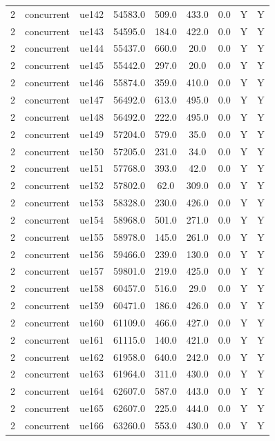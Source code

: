 \begin{table}[ht]
\begin{tabular}{|c|c|c|c|c|c|c|c|c|}
2 & concurrent & ue142 & 54583.0 & 509.0 & 433.0 & 0.0 & Y & Y \\
2 & concurrent & ue143 & 54595.0 & 184.0 & 422.0 & 0.0 & Y & Y \\
2 & concurrent & ue144 & 55437.0 & 660.0 & 20.0 & 0.0 & Y & Y \\
2 & concurrent & ue145 & 55442.0 & 297.0 & 20.0 & 0.0 & Y & Y \\
2 & concurrent & ue146 & 55874.0 & 359.0 & 410.0 & 0.0 & Y & Y \\
2 & concurrent & ue147 & 56492.0 & 613.0 & 495.0 & 0.0 & Y & Y \\
2 & concurrent & ue148 & 56492.0 & 222.0 & 495.0 & 0.0 & Y & Y \\
2 & concurrent & ue149 & 57204.0 & 579.0 & 35.0 & 0.0 & Y & Y \\
2 & concurrent & ue150 & 57205.0 & 231.0 & 34.0 & 0.0 & Y & Y \\
2 & concurrent & ue151 & 57768.0 & 393.0 & 42.0 & 0.0 & Y & Y \\
2 & concurrent & ue152 & 57802.0 & 62.0 & 309.0 & 0.0 & Y & Y \\
2 & concurrent & ue153 & 58328.0 & 230.0 & 426.0 & 0.0 & Y & Y \\
2 & concurrent & ue154 & 58968.0 & 501.0 & 271.0 & 0.0 & Y & Y \\
2 & concurrent & ue155 & 58978.0 & 145.0 & 261.0 & 0.0 & Y & Y \\
2 & concurrent & ue156 & 59466.0 & 239.0 & 130.0 & 0.0 & Y & Y \\
2 & concurrent & ue157 & 59801.0 & 219.0 & 425.0 & 0.0 & Y & Y \\
2 & concurrent & ue158 & 60457.0 & 516.0 & 29.0 & 0.0 & Y & Y \\
2 & concurrent & ue159 & 60471.0 & 186.0 & 426.0 & 0.0 & Y & Y \\
2 & concurrent & ue160 & 61109.0 & 466.0 & 427.0 & 0.0 & Y & Y \\
2 & concurrent & ue161 & 61115.0 & 140.0 & 421.0 & 0.0 & Y & Y \\
2 & concurrent & ue162 & 61958.0 & 640.0 & 242.0 & 0.0 & Y & Y \\
2 & concurrent & ue163 & 61964.0 & 311.0 & 430.0 & 0.0 & Y & Y \\
2 & concurrent & ue164 & 62607.0 & 587.0 & 443.0 & 0.0 & Y & Y \\
2 & concurrent & ue165 & 62607.0 & 225.0 & 444.0 & 0.0 & Y & Y \\
2 & concurrent & ue166 & 63260.0 & 553.0 & 430.0 & 0.0 & Y & Y \\

\end{tabular}
\end{table}
